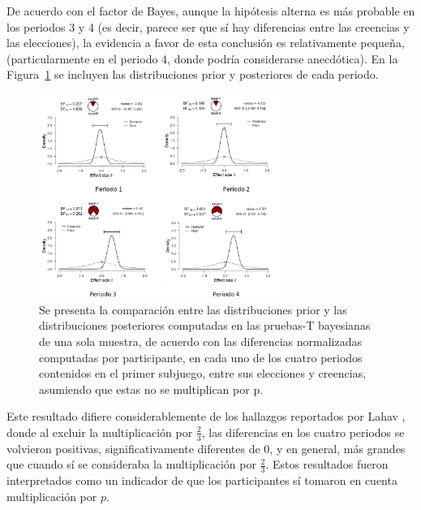 De acuerdo con el factor de Bayes, aunque la hipótesis alterna es más probable en los periodos 3 y 4 (es decir, parece ser que sí hay diferencias entre las creencias y las elecciones), la evidencia a favor de esta conclusión es relativamente pequeña, (particularmente en el periodo 4, donde podría considerarse anecdótica). En la Figura~\ref{fig:DiferenciasNormalizadas_Subjuego1_NoP} se incluyen las distribuciones prior y posteriores de cada periodo.

\begin{figure}[th]
\centering
\includegraphics[width=0.70\textwidth]{Figures/Fig_2} 
\caption[Distribuciones prior y posterior de las Diferencias Normalizadas en el primer Subjuego, (prueba T bayesiana de una muestra), sin incluir la multiplicación por $p$]{Se presenta la comparación entre las distribuciones prior y las distribuciones posteriores computadas en las pruebas-T bayesianas de una sola muestra, de acuerdo con las diferencias normalizadas computadas por participante, en cada uno de los cuatro periodos contenidos en el primer subjuego, entre sus elecciones y creencias, asumiendo que estas no se multiplican por p.}
\label{fig:DiferenciasNormalizadas_Subjuego1_NoP}
\end{figure}

Este resultado difiere considerablemente de los hallazgos reportados por Lahav \parencite*{Lahav2015}, donde al excluir la multiplicación por $\frac{2}{3}$, las diferencias en los cuatro periodos se volvieron positivas, significativamente diferentes de $0$, y en general,  más grandes que cuando sí se consideraba la multiplicación por $\frac{2}{3}$. Estos resultados fueron interpretados como un indicador de que los participantes sí tomaron en cuenta multiplicación por $p$.\\


